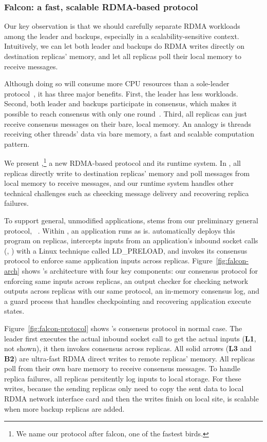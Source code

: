 \vspace{-.15in}\subsubsection{Falcon: a fast, scalable RDMA-based \paxos 
protocol} 
\label{sec:falcon}\vspace{-.075in}

Our key observation is that we should carefully separate RDMA workloads among
the leader and backups, especially in a scalability-sensitive context. 
Intuitively, we can let both leader and backups do RDMA writes directly on 
destination replicas' memory, and let all replicas poll their local memory to 
receive messages.

Although doing so will consume more CPU resources than a sole-leader 
protocol~\cite{dare:hpdc15}, it has three major benefits. First, the leader 
has less workloads. Second, both leader and backups participate in consensus, 
which makes it possible to reach consensus with only one 
round~\cite{paxos:practical}. Third, all replicas can just receive consensus 
messages on their bare, local memory. An analogy is threads receiving other 
threads' data via bare memory, a fast and scalable computation pattern.

We present \falcon,\footnote{We name our protocol after
falcon, one of the fastest birds.} a new RDMA-based \paxos protocol and its
runtime system. In \xxx, all replicas directly write to destination
replicas' memory and poll messages from local memory to receive messages, and 
our runtime system handles other technical challenges such as cheecking message 
delivery and recovering replica failures.

To support general, unmodified applications, \falcon stems from our preliminary 
general protocol, \crane~\cite{crane:sosp15}. Within \falcon, an application 
runs as is. \falcon automatically deploys this program on replicas, intercepts 
inputs from an application's inbound socket calls (\eg, \recv) with a Linux 
technique called LD\_PRELOAD, and invokes its consensus protocol to enforce same 
application inputs across replicas. Figure~\ref{fig:falcon-arch} shows 
\falcon's architecture with four key components: our consensus protocol for 
enforcing same inputs across replicas, an output checker for checking network 
outputs across replicas with our same protocol, an in-memory consensus 
log, and a guard process that handles checkpointing and recovering application 
execute states.

Figure~\ref{fig:falcon-protocol} shows \falcon's consensus protocol in normal 
case. The leader first executes the actual inbound socket call to get the 
actual inputs (\textbf{L1}, not shown), it then invokes consensus across 
replicas. All solid arrows (\textbf{L3} and \textbf{B2}) are ultra-fast RDMA 
direct writes to remote replicas' memory. All replicas poll from their own bare 
memory to receive consensus messages. To handle replica failures, all replicas 
persitently log inputs to local storage. For these writes, because the sending 
replicas only need to copy the sent data to local RDMA network interface card 
and then the writes finish on local site, \falcon is scalable when more backup 
replicas are added.

